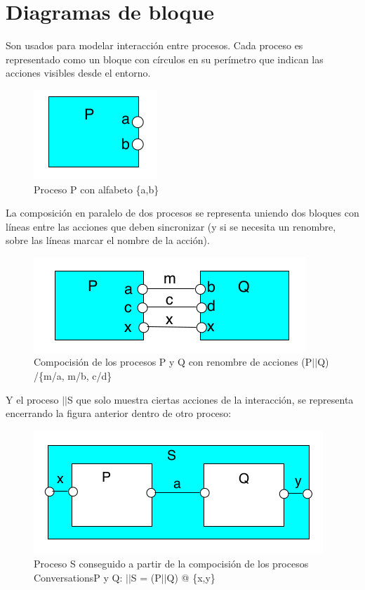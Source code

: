 \section{Diagramas de bloque}
Son usados para modelar interacción entre procesos. Cada proceso es representado como un bloque con círculos en su perímetro que indican las acciones visibles desde el entorno.
\begin{figure}[h]
\centering
	\includegraphics[scale=0.5]{imagenes/bloque_proceso}
	\caption{Proceso P con alfabeto \{a,b\}}
\end{figure}

La composición en paralelo de dos procesos se representa uniendo dos bloques con líneas entre las acciones que deben sincronizar (y si se necesita un renombre, sobre las líneas marcar el nombre de la acción).

\begin{figure}[h]
\centering
	\includegraphics[scale=0.5]{imagenes/bloque_composicion}
	\caption{Compocisión de los procesos P y Q con renombre de acciones (P$||$Q) /\{m/a, m/b, c/d\}}
\end{figure}

Y el proceso $||$S que solo muestra ciertas acciones de la interacción, se representa encerrando la figura anterior dentro de otro proceso:

\begin{figure}[h]
\centering
	\includegraphics[scale=0.5]{imagenes/bloque-proceso-compuesto}
	\caption{Proceso S conseguido a partir de la compocisión de los procesos ConversationsP y Q: $||$S = (P$||$Q) @ \{x,y\}}
\end{figure}





